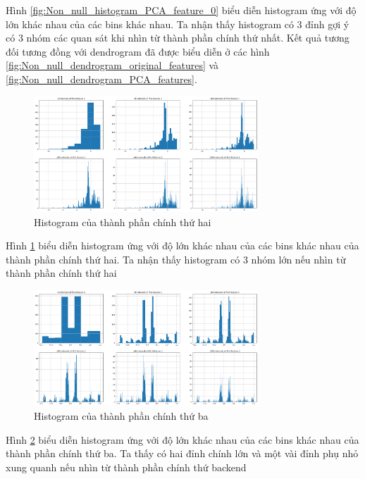 Hình \ref{fig:Non_null_histogram_PCA_feature_0} biểu diễn histogram ứng với độ lớn khác nhau của các bins khác nhau.
Ta nhận thấy histogram có 3 đỉnh gợi ý có 3 nhóm các quan sát khi nhìn từ thành phần chính thứ nhất.
Kết quả tương đối tương đồng với dendrogram đã được biểu diễn ở các hình \ref{fig:Non_null_dendrogram_original_features} và \ref{fig:Non_null_dendrogram_PCA_features}.

\begin{figure}[H]
    \centering
    \includegraphics[width=0.75\textwidth]{figures/Thanh/Data_Analysis/Non_null_histogram_PCA_feature_1.png}
    \caption{Histogram của thành phần chính thứ hai}
    \label{fig:Non_null_histogram_PCA_feature_1}
\end{figure}

Hình \ref{fig:Non_null_histogram_PCA_feature_1} biểu diễn histogram ứng với độ lớn khác nhau của các bins khác nhau của thành phần chính thứ hai.
Ta nhận thấy histogram có 3 nhóm lớn nếu nhìn từ thành phần chính thứ hai

\begin{figure}[H]
    \centering
    \includegraphics[width=0.75\textwidth]{figures/Thanh/Data_Analysis/Non_null_histogram_PCA_feature_2.png}
    \caption{Histogram của thành phần chính thứ ba}
    \label{fig:Non_null_histogram_PCA_feature_2}
\end{figure}

Hình \ref{fig:Non_null_histogram_PCA_feature_2} biểu diễn histogram ứng với độ lớn khác nhau của các bins khác nhau của thành phần chính thứ ba.
Ta thấy có hai đỉnh chính lớn và một vài đỉnh phụ nhỏ xung quanh nếu nhìn từ thành phần chính thứ backend

